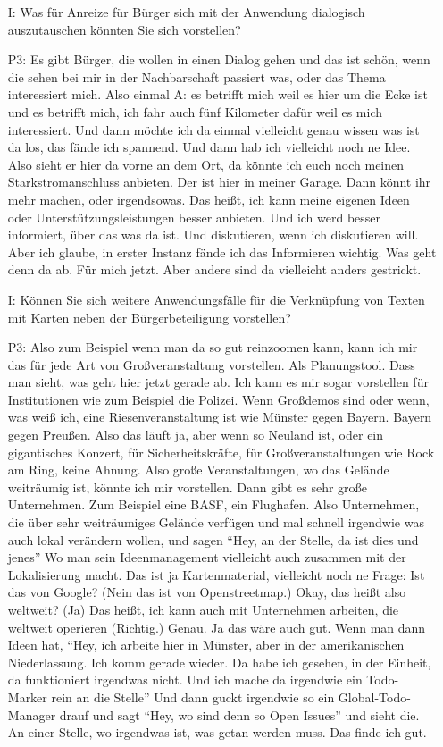 \begin{itemize}
    \item[I:] Was f{\"u}r Anreize f{\"u}r B{\"u}rger sich mit der Anwendung dialogisch auszutauschen k{\"o}nnten Sie sich vorstellen?
    \item[P3:] Es gibt B{\"u}rger, die wollen in einen Dialog gehen und das ist sch{\"o}n, wenn die sehen bei mir in der Nachbarschaft passiert was, oder das Thema interessiert mich. Also einmal A: es betrifft mich weil es hier um die Ecke ist und es betrifft mich, ich fahr auch f{\"u}nf Kilometer daf{\"u}r weil es mich interessiert. Und dann m{\"o}chte ich da einmal vielleicht genau wissen was ist da los, das f{\"a}nde ich spannend. Und dann hab ich vielleicht noch ne Idee. Also sieht er hier da vorne an dem Ort, da k{\"o}nnte ich euch noch meinen Starkstromanschluss anbieten. Der ist hier in meiner Garage. Dann k{\"o}nnt ihr mehr machen, oder irgendsowas. Das hei{\ss}t, ich kann meine eigenen Ideen oder Unterst{\"u}tzungsleistungen besser anbieten. Und ich werd besser informiert, {\"u}ber das was da ist. Und diskutieren, wenn ich diskutieren will. Aber ich glaube, in erster Instanz f{\"a}nde ich das Informieren wichtig. Was geht denn da ab. F{\"u}r mich jetzt. Aber andere sind da vielleicht anders gestrickt.
    \item[I:] K{\"o}nnen Sie sich weitere Anwendungsf{\"a}lle f{\"u}r die Verkn{\"u}pfung von Texten mit Karten neben der B{\"u}rgerbeteiligung vorstellen?
    \item[P3:] Also zum Beispiel wenn man da so gut reinzoomen kann, kann ich mir das f{\"u}r jede Art von Gro{\ss}veranstaltung vorstellen. Als Planungstool. Dass man sieht, was geht hier jetzt gerade ab. Ich kann es mir sogar vorstellen f{\"u}r Institutionen wie zum Beispiel die Polizei. Wenn Gro{\ss}demos sind oder wenn, was wei{\ss} ich, eine Riesenveranstaltung ist wie M{\"u}nster gegen Bayern. Bayern gegen Preu{\ss}en. Also das l{\"a}uft ja, aber wenn so Neuland ist, oder ein gigantisches Konzert, f{\"u}r Sicherheitskr{\"a}fte, f{\"u}r Gro{\ss}veranstaltungen wie Rock am Ring, keine Ahnung. Also gro{\ss}e Veranstaltungen, wo das Gel{\"a}nde weitr{\"a}umig ist, k{\"o}nnte ich mir vorstellen. Dann gibt es sehr gro{\ss}e Unternehmen. Zum Beispiel eine BASF, ein Flughafen. Also Unternehmen, die {\"u}ber sehr weitr{\"a}umiges Gel{\"a}nde verf{\"u}gen und mal schnell irgendwie was auch lokal ver{\"a}ndern wollen, und sagen "`Hey, an der Stelle, da ist dies und jenes"' Wo man sein Ideenmanagement vielleicht auch zusammen mit der Lokalisierung macht. Das ist ja Kartenmaterial, vielleicht noch ne Frage: Ist das von Google? (Nein das ist von Openstreetmap.) Okay, das hei{\ss}t also weltweit? (Ja) Das hei{\ss}t, ich kann auch mit Unternehmen arbeiten, die weltweit operieren (Richtig.) Genau. Ja das w{\"a}re auch gut. Wenn man dann Ideen hat, "`Hey, ich arbeite hier in M{\"u}nster, aber in der amerikanischen Niederlassung. Ich komm gerade wieder. Da habe ich gesehen, in der Einheit, da funktioniert irgendwas nicht. Und ich mache da irgendwie ein Todo-Marker rein an die Stelle"' Und dann guckt irgendwie so ein Global-Todo-Manager drauf und sagt "`Hey, wo sind denn so Open Issues"' und sieht die. An einer Stelle, wo irgendwas ist, was getan werden muss. Das finde ich gut.

\end{itemize}
